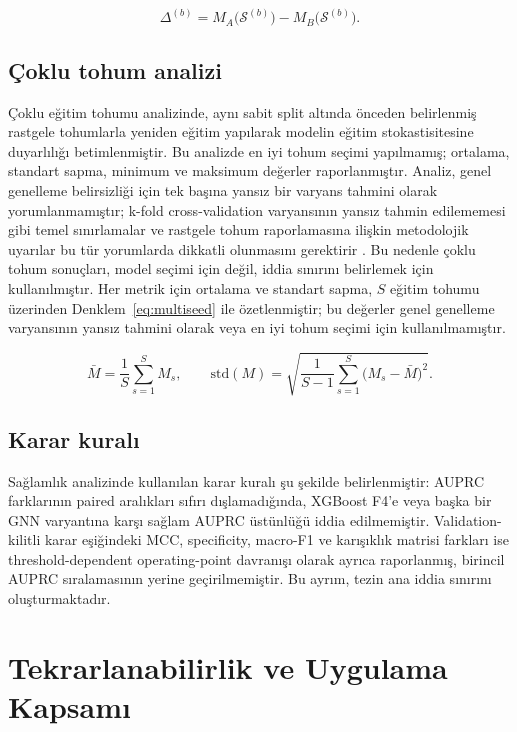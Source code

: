 \begin{equation}
\Delta^{(b)} = M_A\big(\mathcal{S}^{(b)}\big) - M_B\big(\mathcal{S}^{(b)}\big).
\label{eq:paired-diff}
\end{equation}

\subsection{Çoklu tohum analizi}

Çoklu eğitim tohumu analizinde, aynı sabit split altında önceden belirlenmiş rastgele tohumlarla yeniden eğitim yapılarak modelin eğitim stokastisitesine duyarlılığı betimlenmiştir. Bu analizde en iyi tohum seçimi yapılmamış; ortalama, standart sapma, minimum ve maksimum değerler raporlanmıştır. Analiz, genel genelleme belirsizliği için tek başına yansız bir varyans tahmini olarak yorumlanmamıştır; k-fold cross-validation varyansının yansız tahmin edilememesi gibi temel sınırlamalar ve rastgele tohum raporlamasına ilişkin metodolojik uyarılar bu tür yorumlarda dikkatli olunmasını gerektirir . Bu nedenle çoklu tohum sonuçları, model seçimi için değil, iddia sınırını belirlemek için kullanılmıştır. Her metrik için ortalama ve standart sapma, \(S\) eğitim tohumu üzerinden Denklem~\ref{eq:multiseed} ile özetlenmiştir; bu değerler genel genelleme varyansının yansız tahmini olarak veya en iyi tohum seçimi için kullanılmamıştır.

\begin{equation}
\bar{M} = \frac{1}{S}\sum_{s=1}^{S} M_s, \qquad
\mathrm{std}(M) = \sqrt{\frac{1}{S-1}\sum_{s=1}^{S}\big(M_s - \bar{M}\big)^2}.
\label{eq:multiseed}
\end{equation}

\subsection{Karar kuralı}

Sağlamlık analizinde kullanılan karar kuralı şu şekilde belirlenmiştir: AUPRC farklarının paired aralıkları sıfırı dışlamadığında, XGBoost F4'e veya başka bir GNN varyantına karşı sağlam AUPRC üstünlüğü iddia edilmemiştir. Validation-kilitli karar eşiğindeki MCC, specificity, macro-F1 ve karışıklık matrisi farkları ise threshold-dependent operating-point davranışı olarak ayrıca raporlanmış, birincil AUPRC sıralamasının yerine geçirilmemiştir. Bu ayrım, tezin ana iddia sınırını oluşturmaktadır.

\section{Tekrarlanabilirlik ve Uygulama Kapsamı}

